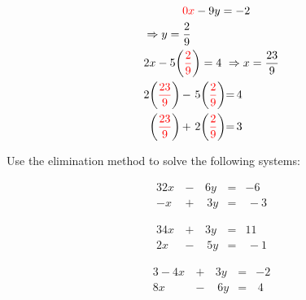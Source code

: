 \documentclass[../mathNotesPreamble]{subfiles}
\begin{document}
{{\begin{minipage}[t]{0.45\linewidth}
\begin{align*}
      &\phantom{\Rightarrow}\hspace*{24pt}\textcolor{red}{0x}-9y=-2\\
      &\Rightarrow y=\frac{2}{9}\\
      & 2x-5\parens{\textcolor{red}{\frac{2}{9}}}=4
      \ \Rightarrow x=\frac{23}{9}\\
        &\begin{array}{*{3}{@{}r@{}l}}
          2\parens{\textcolor{red}{\displaystyle\frac{23}{9}}}&\,-\,&5\parens{\textcolor{red}{\displaystyle\frac{2}{9}}}&=&4\\[10pt]
          \parens{\textcolor{red}{\displaystyle\frac{23}{9}}}&\,+&\,2\parens{\textcolor{red}{\displaystyle\frac{2}{9}}}&=&\,3
      \end{array}
    \end{align*}
    \end{minipage}%
    \vspace*{5pt}
  }}
  \pagebreak

  \begin{ex*}
    Use the elimination method to solve the following systems:
  \end{ex*}
  \noindent
  \begin{minipage}{0.25\linewidth}
    \begin{alignat*}{3}
      2x&\,-\,&6y&=&-6\\
      -x&\,+&\,3y&=&\,-3
    \end{alignat*}
  \end{minipage}%

  \noindent
  \begin{minipage}{0.25\linewidth}
    \begin{alignat*}{3}
      4x&\,+\,&3y&=&11\\
      2x&\,-&\,5y&=&\,-1
    \end{alignat*}
  \end{minipage}%

  \noindent
  \begin{minipage}{0.25\linewidth}
    \begin{alignat*}{3}
      -4x&\,+\,&3y&=&-2\\
      8x&\,-&\,6y&=&\,4
    \end{alignat*}
  \end{minipage}
  \pagebreak
\end{document}
